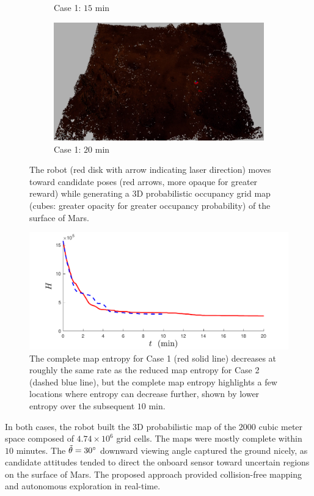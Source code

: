 \documentclass[conf]{new-aiaa}
\begin{document}
\begin{figure}[!t]
\begin{subfigure}[t]{0.4\columnwidth}
        		\caption{Case 1: $15$ min}
		\vspace*{0.025\textwidth}
    	\end{subfigure}
    	\begin{subfigure}[t]{0.4\columnwidth}
           	\centering
          	\includegraphics[height=0.5\textwidth]{MarsFullMap20min.jpg}
        		\caption{Case 1: $20$ min}
		\vspace*{0.025\textwidth}
    	\end{subfigure}
\caption{The robot (red disk with arrow indicating laser direction) moves toward candidate poses (red arrows, more opaque for greater reward) while generating a 3D probabilistic occupancy grid map (cubes: greater opacity for greater occupancy probability) of the surface of Mars.}
\label{fig:mars3Dogm}
\end{figure}


	\begin{figure}
		\centerline{
			\includegraphics[width=0.6\columnwidth]{mars_H_comparison_flat.pdf}
		}
		\caption{The complete map entropy for Case 1 (red solid line) decreases at roughly the same rate as the reduced map entropy for Case 2 (dashed blue line), but the complete map entropy highlights a few locations where entropy can decrease further, shown by lower entropy over the subsequent $10$ min.}
		\label{fig:mars3Dentropy}
	\end{figure}


In both cases, the robot built the 3D probabilistic map of the $2000$ cubic meter space composed of $4.74\times10^6$ grid cells. The maps were mostly complete within $10$ minutes. The $\tilde{\theta}=30\degree$ downward viewing angle captured the ground nicely, as candidate attitudes tended to direct the onboard sensor toward uncertain regions on the surface of Mars. The proposed approach provided collision-free mapping and autonomous exploration in real-time.
\end{document}
